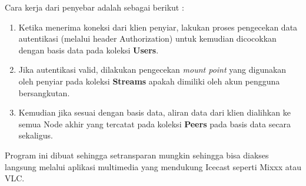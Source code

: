 Cara kerja dari penyebar adalah sebagai berikut :
\begin{enumerate}
\item Ketika menerima koneksi dari klien penyiar, lakukan proses pengecekan data autentikasi (melalui header Authorization) untuk kemudian dicocokkan dengan basis data pada koleksi \textbf{Users}.
\item Jika autentikasi valid, dilakukan pengecekan \emph{mount point} yang digunakan oleh penyiar pada koleksi \textbf{Streams} apakah dimiliki oleh akun pengguna bersangkutan.
\item Kemudian jika sesuai dengan basis data, aliran data dari klien dialihkan ke semua Node akhir yang tercatat pada koleksi \textbf{Peers} pada basis data secara sekaligus.
\end{enumerate}

Program ini dibuat sehingga setransparan mungkin sehingga bisa diakses langsung melalui aplikasi multimedia yang mendukung Icecast seperti Mixxx atau VLC. 
